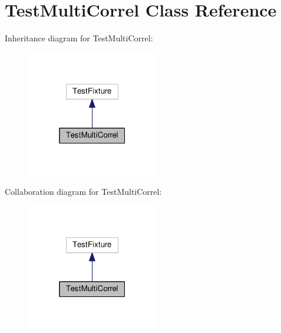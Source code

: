 \hypertarget{class_test_multi_correl}{}\section{Test\+Multi\+Correl Class Reference}
\label{class_test_multi_correl}


Inheritance diagram for Test\+Multi\+Correl\+:
\nopagebreak
\begin{figure}[H]
\begin{center}
\leavevmode
\includegraphics[width=163pt]{class_test_multi_correl__inherit__graph}
\end{center}
\end{figure}


Collaboration diagram for Test\+Multi\+Correl\+:
\nopagebreak
\begin{figure}[H]
\begin{center}
\leavevmode
\includegraphics[width=163pt]{class_test_multi_correl__coll__graph}
\end{center}
\end{figure}
